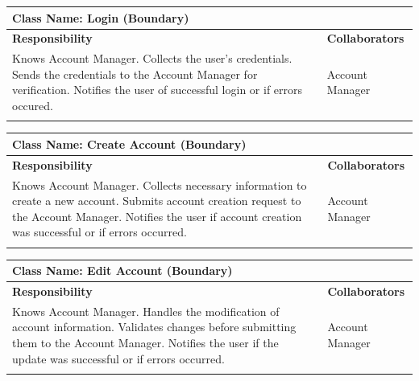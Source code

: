 \documentclass[]{article}
\begin{document}
	\begin{table}[H]
		\centering
		\begin{tabular}{|p{8cm}|p{8cm}|}
		\hline 
		\multicolumn{2}{|l|}{\textbf{Class Name:} Login (Boundary)} \\
		\hline
		\textbf{Responsibility} & \textbf{Collaborators} \\
		\hline
		Knows Account Manager. \newline
		Collects the user's credentials. \newline
		Sends the credentials to the Account Manager for verification. \newline
		Notifies the user of successful login or if errors occured. \newline
		& Account Manager \\
		\vspace{1in} & \\
		\hline
		\end{tabular}
	\end{table}

	\begin{table}[H]
		\centering
		\begin{tabular}{|p{8cm}|p{8cm}|}
		\hline 
		\multicolumn{2}{|l|}{\textbf{Class Name:} Create Account (Boundary)} \\
		\hline
		\textbf{Responsibility} & \textbf{Collaborators} \\
		\hline
		Knows Account Manager. \newline
		Collects necessary information to create a new account. \newline
		Submits account creation request to the Account Manager. \newline
		Notifies the user if account creation was successful or if errors occurred. 
		& Account Manager \\
		\vspace{1in} & \\
		\hline
		\end{tabular}
	\end{table}

	\begin{table}[H]
		\centering
		\begin{tabular}{|p{8cm}|p{8cm}|}
		\hline 
		\multicolumn{2}{|l|}{\textbf{Class Name:} Edit Account (Boundary)} \\
		\hline
		\textbf{Responsibility} & \textbf{Collaborators} \\
		\hline
		Knows Account Manager. \newline
		Handles the modification of account information. \newline
		Validates changes before submitting them to the Account Manager. \newline
		Notifies the user if the update was successful or if errors occurred. 
		& Account Manager \\
		\vspace{1in} & \\
		\hline
		\end{tabular}
	\end{table}
\end{document}
